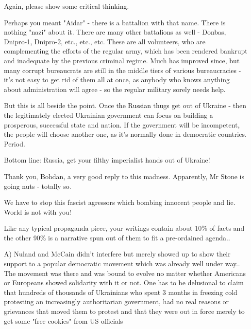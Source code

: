 \begin{itemize}
\begin{itemize}
Again, please show some critical thinking.


Perhaps you meant "Aidar" - there is a battalion with that name. There is
nothing "nazi" about it. There are many other battalions as well - Donbas,
Dnipro-1, Dnipro-2, etc., etc., etc. These are all volunteers, who are
complementing the efforts of the regular army, which has been rendered bankrupt
and inadequate by the previous criminal regime. Much has improved since, but
many corrupt bureaucrats are still in the middle tiers of various bureaucracies
- it's not easy to get rid of them all at once, as anybody who knows anything
about administration will agree - so the regular military sorely needs help.

But this is all beside the point. Once the Russian thugs get out of Ukraine -
then the legitimately elected Ukrainian government can focus on building a
prosperous, successful state and nation. If the government will be incompetent,
the people will choose another one, as it's normally done in democratic
countries. Period.

Bottom line: Russia, get your filthy imperialist hands out of Ukraine!


Thank you, Bohdan, a very good reply to this madness. Apparently, Mr Stone is
going nuts - totally so.


We have to stop this fascist agressors which bombing innocent people and lie.
World is not with you!


\end{itemize} %


Like any typical propaganda piece, your writings contain about 10\% of facts and
the other 90\% is a narrative spun out of them to fit a pre-ordained agenda..

A) Nuland and McCain didn't interfere but merely showed up to show their
support to a popular democratic movement which was already well under way.. The
movement was there and was bound to evolve no matter whether Americans or
Europeans showed solidarity with it or not. One has to be delusional to claim
that hundreds of thousands of Ukrainians who spent 3 months in freezing cold
protesting an increasingly authoritarian government, had no real reasons or
grievances that moved them to protest and that they were out in force merely to
get some "free cookies" from US officials


\end{itemize}

